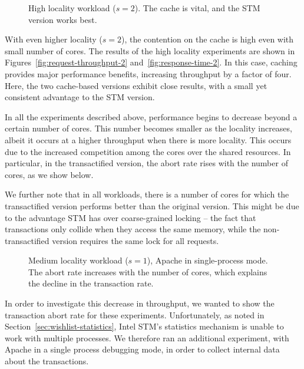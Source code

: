 \documentclass[11pt]{sigplanconf}
\begin{document}
\begin{figure}
 \centering
 \hfill
 \caption{High locality workload ($s = 2$). The cache is vital, and 
 the STM version works best.}
\end{figure}

With even higher locality ($s=2$), the contention on the cache is high even with
small number of cores. The results of the high locality experiments are shown
in Figures~\ref{fig:request-throughput-2} and~\ref{fig:response-time-2}.
In this case, caching provides major performance
benefits, increasing throughput by a factor of four. Here, the two 
cache-based versions exhibit close results, with a small yet consistent
advantage to the STM version.

In all the experiments described above, performance begins to decrease
beyond a certain number of cores. This number becomes smaller as 
the locality increases, albeit it occurs at a higher throughput when
there is more locality. This occurs due to the increased competition
among the cores over the shared resources. In particular, in the 
transactified version, the abort rate rises with the number of cores,
as we show below. 

We further note that in all workloads, there is a number of cores for which the
transactified version performs better than the original version. This might be
due to the advantage STM has over coarse-grained locking -- the fact that
transactions only collide when they access the same memory, while the
non-transactified version requires the same lock for all requests.

\begin{figure}
 \centering
 \hfill
 \caption{Medium locality workload ($s = 1$), Apache in single-process mode.
 The abort rate increases with the number of cores, which explains the decline 
 in the transaction rate.}
\end{figure}

In order to investigate this decrease in throughput, we wanted to show the
transaction abort rate for these experiments. Unfortunately, as noted in
Section~\ref{sec:wishlist-statistics}, Intel STM's statistics mechanism
is unable to work with multiple processes. We therefore ran an additional
experiment, with Apache in a single process debugging mode, in order to collect
internal data about the transactions. 
\end{document}
